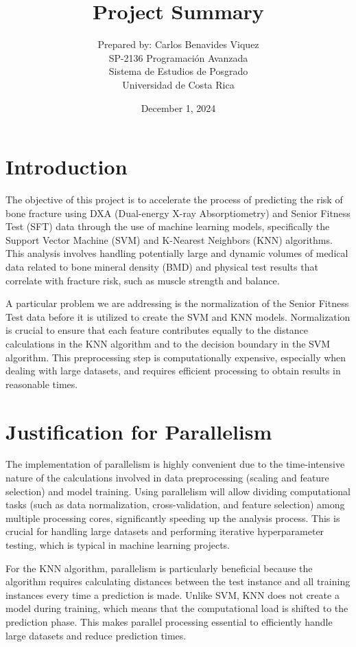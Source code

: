\documentclass[a4paper,12pt]{report}
\title{Project Summary}
\author{Prepared by: Carlos Benavides Viquez\\
SP-2136 Programación Avanzada\\
Sistema de Estudios de Posgrado\\
Universidad de Costa Rica}
\date{December 1, 2024}
\begin{document}
\maketitle

\tableofcontents

\chapter{Introduction}
The objective of this project is to accelerate the process of predicting the risk of bone fracture using DXA (Dual-energy X-ray Absorptiometry) and Senior Fitness Test (SFT) data through the use of machine learning models, specifically the Support Vector Machine (SVM) and K-Nearest Neighbors (KNN) algorithms. This analysis involves handling potentially large and dynamic volumes of medical data related to bone mineral density (BMD) and physical test results that correlate with fracture risk, such as muscle strength and balance.

A particular problem we are addressing is the normalization of the Senior Fitness Test data before it is utilized to create the SVM and KNN models. Normalization is crucial to ensure that each feature contributes equally to the distance calculations in the KNN algorithm and to the decision boundary in the SVM algorithm. This preprocessing step is computationally expensive, especially when dealing with large datasets, and requires efficient processing to obtain results in reasonable times.

\chapter{Justification for Parallelism}
The implementation of parallelism is highly convenient due to the time-intensive nature of the calculations involved in data preprocessing (scaling and feature selection) and model training. Using parallelism will allow dividing computational tasks (such as data normalization, cross-validation, and feature selection) among multiple processing cores, significantly speeding up the analysis process. This is crucial for handling large datasets and performing iterative hyperparameter testing, which is typical in machine learning projects.

For the KNN algorithm, parallelism is particularly beneficial because the algorithm requires calculating distances between the test instance and all training instances every time a prediction is made. Unlike SVM, KNN does not create a model during training, which means that the computational load is shifted to the prediction phase. This makes parallel processing essential to efficiently handle large datasets and reduce prediction times.
\end{document}
